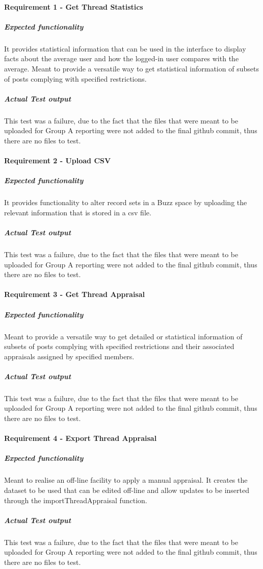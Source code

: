 
\paragraph{Requirement 1 - Get Thread Statistics}
	\subparagraph{Expected functionality}
	It provides statistical information that can be used in the interface to display facts about the average user and how the logged-in user compares with the average. Meant to provide a versatile way to get statistical information of subsets of posts complying with specified restrictions.
	\subparagraph{Actual Test output}
	This test was a failure, due to the fact that the files that were meant to be uploaded for Group A reporting were not added to the final github commit, thus there are no files to test.

\paragraph{Requirement 2 - Upload CSV}
	\subparagraph{Expected functionality}
	It provides functionality to alter record sets in a Buzz space by uploading the relevant information that is stored in a csv file.
	\subparagraph{Actual Test output}
	This test was a failure, due to the fact that the files that were meant to be uploaded for Group A reporting were not added to the final github commit, thus there are no files to test.
	
\paragraph{Requirement 3 - Get Thread Appraisal}
	\subparagraph{Expected functionality}
Meant to provide a versatile way to get detailed or statistical information of subsets of posts complying with specified restrictions and their associated appraisals assigned by specified members.
	\subparagraph{Actual Test output}
	This test was a failure, due to the fact that the files that were meant to be uploaded for Group A reporting were not added to the final github commit, thus there are no files to test.
	 	
\paragraph{Requirement 4 - Export Thread Appraisal}
	\subparagraph{Expected functionality}
	Meant to realise an off-line facility to apply a manual appraisal. It creates the dataset to be used that can be edited off-line and allow updates to be inserted through the importThreadAppraisal function.
	\subparagraph{Actual Test output}
	This test was a failure, due to the fact that the files that were meant to be uploaded for Group A reporting were not added to the final github commit, thus there are no files to test.
	
